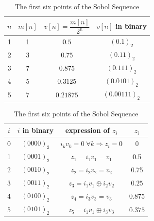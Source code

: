 \documentclass{article}
\theoremstyle{definition}
\begin{document}
\begin{appendices}
\begin{table}[H]
\begin{minipage}{0.48\textwidth}
\centering
\begin{tabular}{|c|c|c|c|}
\hline
$n$ & $m[n]$ & $v[n] = \dfrac{m[n]}{2^n}$ & $v[n]$ in binary \\[5pt] \hline
1 & 1 & $0.5$     & $(0.1)_2$ \\ \hline
2 & 3 & $0.75$    & $(0.11)_2$ \\ \hline
3 & 7 & $0.875$   & $(0.111)_2$ \\ \hline
4 & 5 & $0.3125$  & $(0.0101)_2$ \\ \hline
5 & 7 & $0.21875$ & $(0.00111)_2$ \\ \hline
\end{tabular}
\caption{Values of $v[n]$}
\label{direction numbers}
\end{minipage}
\hfill
\begin{minipage}{0.48\textwidth}
\centering
\begin{tabular}{|c|c|c|c|}
\hline
$i$ & $i$ in binary  & expression of $z_i$ & $z_i$ \\ \hline
0 & $(0000)_2$ & $i_k v_k = 0 \;\forall k\Rightarrow z_i=0$ & $0$ \\ \hline
1 & $(0001)_2$ & $z_1=i_1 v_1 = v_1$&0.5 \\ \hline
2 & $(0010)_2$ & $z_2=i_2 v_2 = v_2$&0.75 \\ \hline
3 & $(0011)_2$ & $z_3=i_1v_1\oplus i_2v_2 $ & $0.25$ \\ \hline
4 & $(0100)_2$ & $z_4=i_3 v_3 = v_3$ & $0.875$ \\ \hline
5 & $(0101)_2$ & $z_5=i_1v_1\oplus i_3 v_3$ & $0.375$ \\ \hline
\end{tabular}
\caption{The first six points of the Sobol Sequence}
\label{Sobol Points}
\end{minipage}
\end{table}


\end{appendices}
\end{document}

